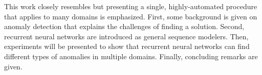 This work closely resembles \cite{Malhotra2015} but presenting a single, highly-automated procedure that applies to many domains is emphasized. First, some background is given on anomaly detection that explains the challenges of finding a solution. Second, recurrent neural networks are introduced as general sequence modelers. Then, experiments will be presented to show that recurrent neural networks can find different types of anomalies in multiple domains. Finally, concluding remarks are given.


